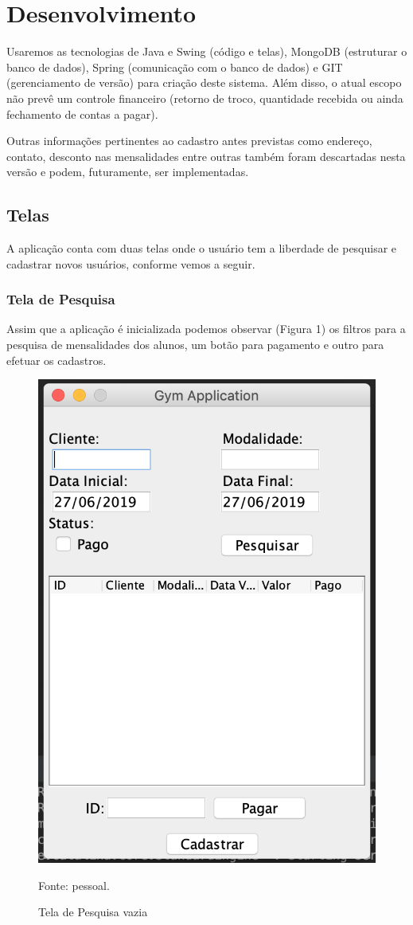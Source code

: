 \chapter{Desenvolvimento}\label{cap_intro}

Usaremos as tecnologias de Java e Swing (código e telas), MongoDB (estruturar o banco de dados), Spring (comunicação com o banco de dados) e GIT (gerenciamento de versão) para criação deste sistema. Além disso, o atual escopo não prevê um controle financeiro (retorno de troco, quantidade recebida ou ainda fechamento de contas a pagar).

Outras informações pertinentes ao cadastro antes previstas como endereço, contato, desconto nas mensalidades entre outras também foram descartadas nesta versão e podem, futuramente, ser implementadas.

\section{Telas}

 A aplicação conta com duas telas onde o usuário tem a liberdade de pesquisar e cadastrar novos usuários, conforme vemos a seguir.
 
\subsection{Tela de Pesquisa}
 
 Assim que a aplicação é inicializada podemos observar (Figura 1) os filtros para a pesquisa de mensalidades dos alunos, um botão para pagamento e outro para efetuar os cadastros.
 
 \begin{figure}[H]
 	\centering
 	\includegraphics[width=0.5\linewidth]{images/telaBuscaVazia}
 	\caption{Tela de Pesquisa vazia}
 	Fonte: pessoal.
 	\label{fig:telaBuscaVazia}
 \end{figure}
 
